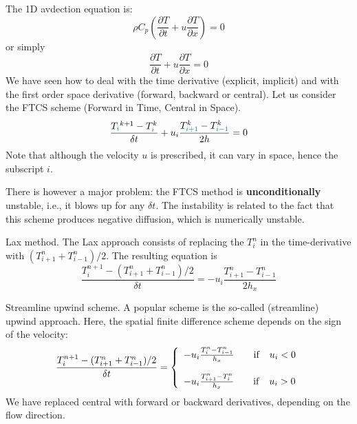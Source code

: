 The 1D avdection equation is:
\begin{equation}
\rho C_p \left( \frac{\partial T}{\partial t}  
+ u \frac{\partial T}{\partial x} \right)=0 
\end{equation}
or simply
\begin{equation}
\frac{\partial T}{\partial t} + u \frac{\partial T}{\partial x}=0 
\end{equation}
We have seen how to deal with the time derivative (explicit, implicit) 
and with the first order space derivative (forward, backward or central).
Let us consider the FTCS scheme (Forward in Time, Central in Space).
\[
\frac{T_{\color{teal}i}^{k+1}-T^k_{\color{teal}i}}{\delta t} 
+ u_i \frac{T^k_{\color{teal}i+1} - T^k_{{\color{teal}i-1}}}{2h} =0 
\]
Note that although the velocity $u$ is prescribed, it can vary in space, hence
the subscript $i$. 

There is however a major problem: 
the FTCS method is {\bf unconditionally} unstable, i.e., it blows up for any $\delta t$.
The instability is related to the fact that this scheme produces negative diffusion, 
which is numerically unstable.




{\color{olive} Lax method}. The Lax approach consists of replacing the $T_i^n$ in the time-derivative with
$(T_{i+1}^n + T_{i-1}^n)/2$. The resulting equation is
\[
\frac{T_i^{n+1}-  (T_{i+1}^n + T_{i-1}^n)/2   }{\delta t} = - u_i \frac{T^n_{i+1}-T^n_{i-1}}{2 h_x}
\]

{\color{olive}Streamline upwind scheme}. A popular scheme is the so-called (streamline) upwind approach. 
Here, the spatial finite difference scheme depends on the sign of the velocity:
\[
\frac{T_i^{n+1}-  (T_{i+1}^n + T_{i-1}^n)/2   }{\delta t} =
\left\{
\begin{array}{l}
 - u_i \frac{T^n_{i}-T^n_{i-1}}{h_x}  \quad\quad  {\rm if} \quad u_i<0\\ \\
 - u_i \frac{T^n_{i+1}-T^n_{i}}{h_x}  \quad\quad  {\rm if} \quad u_i>0
\end{array}
\right.
\]
We have replaced central with forward or backward derivatives, depending on the flow direction. 



